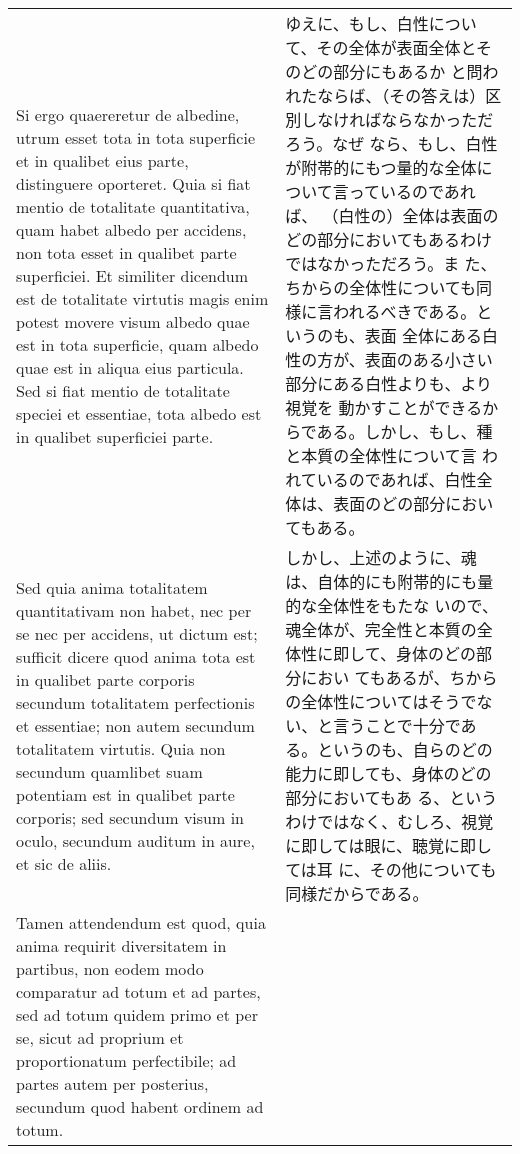 \documentclass[paper=a4paper,fontsize=10pt,jafontsize=9pt,titlepage]{jlreq}
\begin{document}
\begin{longtable}{p{21em}p{21em}}
\\

 Si ergo quaereretur de albedine, utrum esset tota in tota superficie
 et in qualibet eius parte, distinguere oporteret. Quia si fiat mentio
 de totalitate quantitativa, quam habet albedo per accidens, non tota
 esset in qualibet parte superficiei. Et similiter dicendum est de
 totalitate virtutis magis enim potest movere visum albedo quae est in
 tota superficie, quam albedo quae est in aliqua eius particula. Sed
 si fiat mentio de totalitate speciei et essentiae, tota albedo est in
 qualibet superficiei parte.

&

ゆえに、もし、白性について、その全体が表面全体とそのどの部分にもあるか
と問われたならば、（その答えは）区別しなければならなかっただろう。なぜ
なら、もし、白性が附帯的にもつ量的な全体について言っているのであれば、
（白性の）全体は表面のどの部分においてもあるわけではなかっただろう。ま
た、ちからの全体性についても同様に言われるべきである。というのも、表面
全体にある白性の方が、表面のある小さい部分にある白性よりも、より視覚を
動かすことができるからである。しかし、もし、種と本質の全体性について言
われているのであれば、白性全体は、表面のどの部分においてもある。
 
\\

 Sed quia anima totalitatem quantitativam non habet, nec per se nec
 per accidens, ut dictum est; sufficit dicere quod anima tota est in
 qualibet parte corporis secundum totalitatem perfectionis et
 essentiae; non autem secundum totalitatem virtutis. Quia non secundum
 quamlibet suam potentiam est in qualibet parte corporis; sed secundum
 visum in oculo, secundum auditum in aure, et sic de aliis.

 &

 しかし、上述のように、魂は、自体的にも附帯的にも量的な全体性をもたな
 いので、魂全体が、完全性と本質の全体性に即して、身体のどの部分におい
 てもあるが、ちからの全体性についてはそうでない、と言うことで十分であ
 る。というのも、自らのどの能力に即しても、身体のどの部分においてもあ
 る、というわけではなく、むしろ、視覚に即しては眼に、聴覚に即しては耳
 に、その他についても同様だからである。

\\

 Tamen attendendum est quod, quia anima requirit diversitatem in
 partibus, non eodem modo comparatur ad totum et ad partes, sed ad
 totum quidem primo et per se, sicut ad proprium et proportionatum
 perfectibile; ad partes autem per posterius, secundum quod habent
 ordinem ad totum.


\end{longtable}
\end{document}
